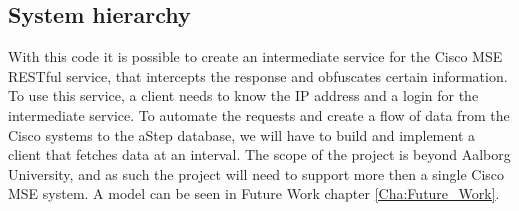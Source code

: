\subsection{System hierarchy}\label{subsec:system_hierarchy}
With this code it is possible to create an intermediate service for the Cisco MSE RESTful service, that intercepts the response and obfuscates certain information. To use this service, a client needs to know the IP address and a login for the intermediate service. To automate the requests and create a flow of data from the Cisco systems to the aStep database, we will have to build and implement a client that fetches data at an interval. The scope of the project is beyond Aalborg University, and as such the project will need to support more then a single Cisco MSE system. A model can be seen in Future Work chapter \ref{Cha:Future_Work}. 